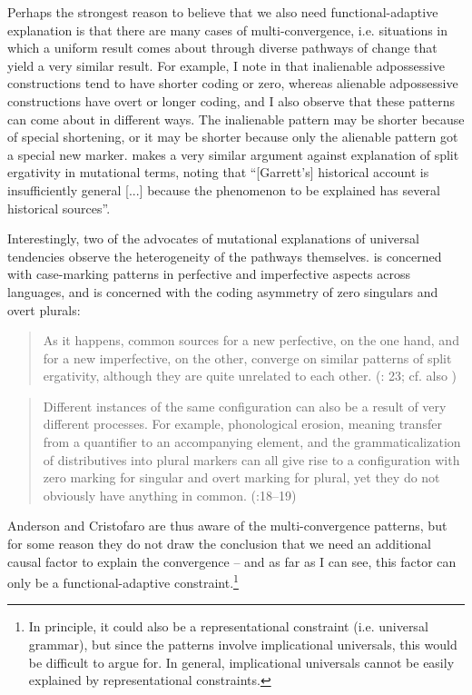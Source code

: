\documentclass[output=paper]{langsci/langscibook}
\begin{document}
Perhaps the strongest reason to believe that we also need functional-adaptive explanation is that there are many cases of multi-convergence, i.e. situations in which a uniform result comes about through diverse pathways of change that yield a very similar result. For example, I note in \citet{Haspelmath2017} that inalienable adpossessive constructions tend to have shorter coding or zero, whereas alienable adpossessive constructions have overt or longer coding, and I also observe that these patterns can come about in different ways. The inalienable pattern may be shorter because of special shortening, or it may be shorter because only the alienable pattern got a special new marker. \citet[37]{Kiparsky2008} makes a very similar argument against  explanation of split ergativity in mutational terms, noting that “[Garrett’s] historical account is insufficiently general [...] because the phenomenon to be explained has several historical sources”.

Interestingly, two of the advocates of mutational explanations of universal tendencies observe the heterogeneity of the pathways themselves. \citet{Anderson2016} is concerned with case-marking patterns in perfective and imperfective aspects across languages, and \citet{Cristofaro2017} is concerned with the coding asymmetry of zero singulars and overt plurals:

\begin{quote}
As it happens, common sources for a new perfective, on the one hand, and for a new imperfective, on the other, converge on similar patterns of split ergativity, although they are quite unrelated to each other. (\citealt{Anderson2016}: 23; cf. also \citealt{Anderson1977})
\end{quote}

\begin{quote}
Different instances of the same configuration can also be a result of very different processes. For example, phonological erosion, meaning transfer from a quantifier to an accompanying element, and the grammaticalization of distributives into plural markers can all give rise to a configuration with zero marking for singular and overt marking for plural, yet they do not obviously have anything in common. (\citealt{Cristofaro2017}:18–19)
\end{quote}

Anderson and Cristofaro are thus aware of the multi-convergence patterns, but for some reason they do not draw the conclusion that we need an additional causal factor to explain the convergence – and as far as I can see, this factor can only be a functional-adaptive constraint.\footnote{In principle, it could also be a representational constraint (i.e. universal grammar), but since the patterns involve implicational universals, this would be difficult to argue for. In general, implicational universals cannot be easily explained by representational constraints.}
\end{document}
